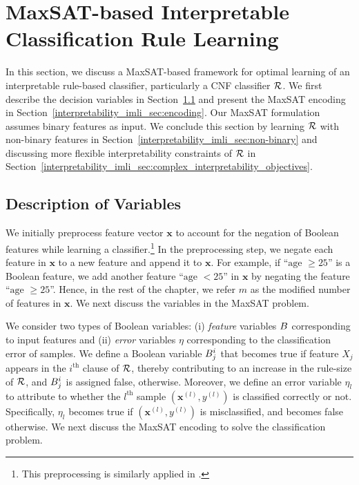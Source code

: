 \section{MaxSAT-based Interpretable Classification Rule Learning}
\label{interpretability_imli_sec:baseline}
In this section, we discuss a MaxSAT-based framework for optimal learning of an interpretable rule-based classifier, particularly a CNF classifier $ {\mathcal{R}} $. 
We first describe the decision variables in Section~\ref{interpretability_imli_sec:variables} and present the MaxSAT encoding  in Section~\ref{interpretability_imli_sec:encoding}. Our MaxSAT formulation assumes binary features as input. We
conclude this section by learning $ {\mathcal{R}} $ with non-binary features in Section~\ref{interpretability_imli_sec:non-binary} and discussing more flexible interpretability constraints of $ {\mathcal{R}} $ in Section~\ref{interpretability_imli_sec:complex_interpretability_objectives}.  



\subsection{Description of Variables}
\label{interpretability_imli_sec:variables} 
We initially preprocess feature vector $ \mathbf{x} $  to account for the negation of  Boolean features while learning a classifier.\footnote{This preprocessing is similarly applied in  \cite{malioutov2013exact}.} In the preprocessing step, we negate each feature in $ \mathbf{x} $ to a new feature and append it to $ \mathbf{x} $. For example, if ``$ \text{age }\ge 25 $'' is a Boolean feature, we add another feature ``$ \text{age }< 25 $'' in  $ \mathbf{x} $ by negating the feature ``$ \text{age }\ge 25 $''. Hence, in the rest of the chapter, we refer $ m $ as the modified number of features in $ \mathbf{x} $. We next discuss the variables in the MaxSAT problem. 

We consider two types of Boolean variables: (i) \emph{feature} variables $ B $ corresponding to input features and (ii) \emph{error} variables $ \eta $ corresponding to the classification error of samples. We define a Boolean variable $ B^i_j $ that becomes true if feature $ X_j $ appears in the $ i^\text{th} $ clause of $ {\mathcal{R}} $, thereby contributing to an increase in the rule-size of $ {\mathcal{R}} $, and $ B^i_j $ is assigned false, otherwise. Moreover, we define an error variable $ \eta_l $ to attribute to whether the $ l^\text{th} $ sample $ (\mathbf{x}^{(l)}, y^{(l)}) $ is classified correctly or not. Specifically, $ \eta_l $ becomes true if $ (\mathbf{x}^{(l)}, y^{(l)}) $ is misclassified, and becomes false otherwise.  We next discuss the MaxSAT encoding to solve the classification problem.   




